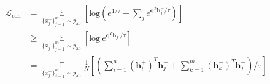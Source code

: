 \begin{small}
\begin{equation}
\label{eq:second_loss}
\begin{split}
 \mathcal{L}_{\text{con}} &=\!\!\!\!\mathop{\mathbb{E}}\limits_{\{x^-_j\}_{j=1}^{m}\sim p_{\text{ab}}}\left[\text{log}\left(e^{1/\tau} + \sum_{j}e^{\boldsymbol{q}^T\boldsymbol{h}^-_j/\tau}\right)\right]\\ 
\!\!\!\!&\geq\!\!\!\!\mathop{\mathbb{E}}\limits_{\{x^-_j\}_{j=1}^{m}\sim p_{\text{ab}}}\left[\text{log}~e^{\boldsymbol{q}^T\boldsymbol{h}^-_j/\tau}\right] \\ 
\!\!\!\!&=\!\!\!\!\!\!\! \mathop{\mathbb{E}}\limits_{\{x^-_j\}_{j=1}^{m}\sim p_{\text{ab}}}\!\!\frac{1}{N}\!\!\left[\left(\sum_{i=1}^{n}(\boldsymbol{h}^+_i)^T\boldsymbol{h}^-_j \!\!+\!\! \sum_{k=1}^{m}(\boldsymbol{h}^-_k)^T\boldsymbol{h}^-_j\!\!\right)\!/\tau\!\right] \\ 
\end{split}
\end{equation}
\end{small}


